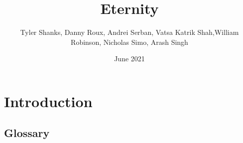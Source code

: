 \documentclass[titlepage]{article}
\begin{document}
\title{Eternity}
\author{Tyler Shanks, Danny Roux, Andrei Serban, Vatsa Katrik Shah,\newpage William Robinson, Nicholas Simo, Arash Singh}
\date{June 2021}
\maketitle

\fancyfoot{\thepage}

\tableofcontents
\newpage

\section{Introduction}
    \subsection{Glossary}
        \blindtext[5]
\end{document}
